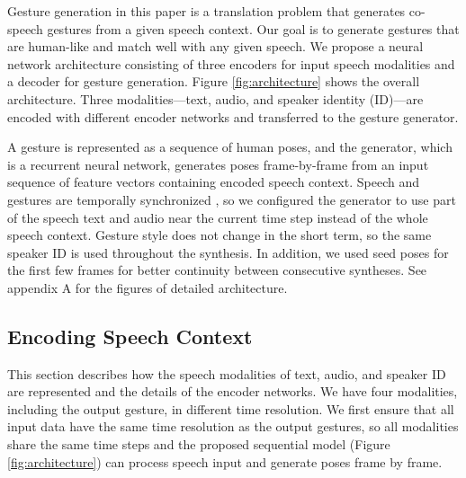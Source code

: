 \documentclass[acmtog]{acmart}
\begin{document}
Gesture generation in this paper is a translation problem that generates co-speech gestures from a given speech context. Our goal is to generate gestures that are human-like and match well with any given speech. We propose a neural network architecture consisting of three encoders for input speech modalities and a decoder for gesture generation. Figure \ref{fig:architecture} shows the overall architecture. Three modalities---text, audio, and speaker identity (ID)---are encoded with different encoder networks and transferred to the gesture generator.

A gesture is represented as a sequence of human poses, and the generator, which is a recurrent neural network, generates poses frame-by-frame from an input sequence of feature vectors containing encoded speech context. Speech and gestures are temporally synchronized \cite{mcneill2008gesture, chu2014synchronization}, so we configured the generator to use part of the speech text and audio near the current time step instead of the whole speech context. Gesture style does not change in the short term, so the same speaker ID is used throughout the synthesis. In addition, we used seed poses for the first few frames for better continuity between consecutive syntheses. See appendix A for the figures of detailed architecture.

\subsection{Encoding Speech Context}
This section describes how the speech modalities of text, audio, and speaker ID are represented and the details of the encoder networks. We have four modalities, including the output gesture, in different time resolution. We first ensure that all input data have the same time resolution as the output gestures, so all modalities share the same time steps and the proposed sequential model (Figure \ref{fig:architecture}) can process speech input and generate poses frame by frame. 
\end{document}

